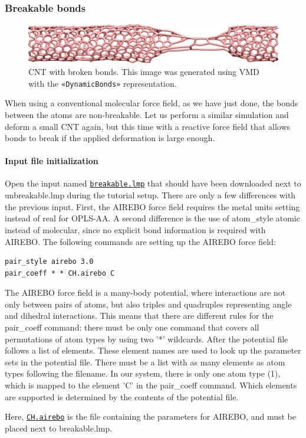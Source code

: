 \documentclass[9pt,tutorial]{livecoms}
\newcommand{\lmpcmd}[1]{\colorbox{listing}{\textcolor{command}{\small{#1}}}} %
\newcommand{\guicmd}[1]{\textcolor{command}{\texttt{«#1»}}} %
\newcommand{\dwlcmd}[1]{\textcolor{download}{\texttt{#1}}} %
\newcommand{\filepath}{https://raw.githubusercontent.com/lammpstutorials/lammpstutorials-article/main/files/}
\begin{document}
\subsubsection{Breakable bonds}

\begin{figure}
\centering
\includegraphics[width=\linewidth]{CNT-deformed-breakable}
\caption{CNT with broken bonds.  This image was generated using
VMD~\cite{vmd_home,humphrey1996vmd} with the \guicmd{DynamicBonds} representation.}
\label{fig:CNT-deformed-breakable}
\end{figure}

When using a conventional molecular force field, as we have just done,
the bonds between the atoms are non-breakable.  Let us perform a similar
simulation and deform a small CNT again, but this time with a reactive
force field that allows bonds to break if the applied deformation is
large enough.

\paragraph{Input file initialization}

Open the input named \href{\filepath tutorial2/breakable.lmp}{\dwlcmd{breakable.lmp}}
that should have been downloaded next to \lmpcmd{unbreakable.lmp} during
the tutorial setup.  There are only a few differences with the previous
input.  First, the AIREBO force field requires the \lmpcmd{metal} units
setting instead of \lmpcmd{real} for OPLS-AA.  A second difference is
the use of \lmpcmd{atom\_style atomic} instead of
\lmpcmd{molecular}, since no explicit bond information is required with
AIREBO.  The following commands are setting up the AIREBO force field:
\begin{lstlisting}
pair_style airebo 3.0
pair_coeff * * CH.airebo C
\end{lstlisting}
\begin{note}
  The AIREBO force field is a many-body
  potential, where interactions are not only between pairs of atoms,
  but also triples and quadruples representing angle and dihedral
  interactions.  This means that there are different rules for the
  \lmpcmd{pair\_coeff} command: there must be only one command that
  covers all permutations of atom types by using two '*' wildcards.
  After the potential file follows a list of elements.  These element
  names are used to look up the parameter sets in the potential file.
  There must be a list with as many elements as atom types following
  the filename.  In our system, there is only one atom type (1), which is
  mapped to the element 'C' in the \lmpcmd{pair\_coeff} command.
  Which elements are supported is determined by the contents of the
  potential file.
\end{note}
Here, \href{\filepath tutorial2/CH.airebo}{\dwlcmd{CH.airebo}} is the
file containing the parameters for AIREBO, and must be placed next to
\lmpcmd{breakable.lmp}.
\end{document}
